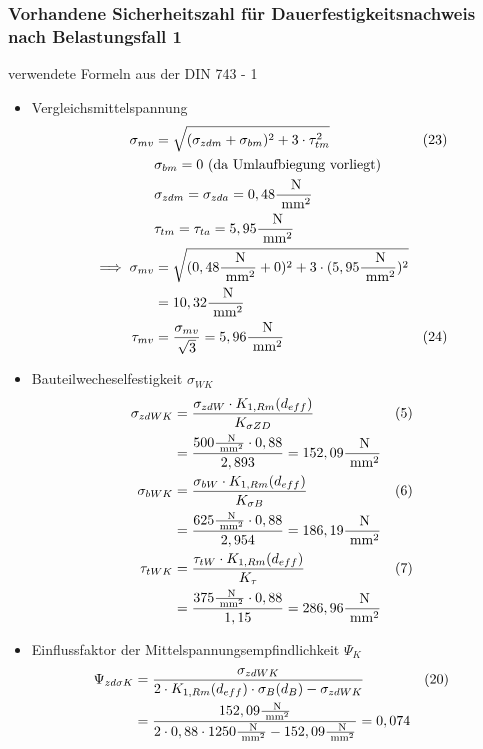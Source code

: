 \subsubsection{Vorhandene Sicherheitszahl für Dauerfestigkeitsnachweis nach Belastungsfall 1 }
verwendete Formeln aus der DIN 743 - 1
\begin{itemize}
\item Vergleichsmittelspannung 
	\begin{align*}
	\sigma_{mv}&= \sqrt{(\sigma_{zdm} +\sigma_{bm} )^2+ 3 \cdot \tau_{tm}^2 } & (23) \\
	&\sigma_{bm}= 0 \text{ (da Umlaufbiegung vorliegt)} \\
	&\sigma_{zdm} = \sigma_{zda} = 0,48\frac{\text{ N}}{\text{ mm}^2} \\
	&\tau_{tm} = \tau_{ta} = 5,95 \frac{\text{ N}}{\text{ mm}^2} \\
	\implies \sigma_{mv}&= \sqrt{(0,48 \frac{\text{ N}}{\text{ mm}^2} +0 )^2+ 3 \cdot (5,95 \frac{\text{ N}}{\text{ mm}^2})^2 }  \\
	&= 10,32 \frac{\text{ N}}{\text{ mm}^2} \\
	\tau_{mv} &= \frac{\sigma_{mv}}{\sqrt{3}} = 5,96 \frac{\text{ N}}{\text{ mm}^2} & (24)
	\end{align*}
\item Bauteilwecheselfestigkeit $\sigma_{WK}$ 
	\begin{align*}
	\sigma_{zdWK}&= \frac{\sigma_{zdW} \cdot K_{1,Rm} (d_{eff})}{K_{\sigma ZD}}  & (5)\\
	&=  \frac{500 \frac{\text{ N}}{\text{ mm}^2}\cdot 0,88}{2,893} = 152,09 \frac{\text{ N}}{\text{ mm}^2}\\
	\sigma_{bWK}&= \frac{\sigma_{bW} \cdot K_{1,Rm} (d_{eff})}{K_{\sigma B}}  & (6 )\\
	&=  \frac{625 \frac{\text{ N}}{\text{ mm}^2}\cdot 0,88}{2,954} = 186,19 \frac{\text{ N}}{\text{ mm}^2}\\
	\tau_{tWK}&= \frac{\tau_{tW} \cdot K_{1,Rm} (d_{eff})}{K_{\tau}} &(7) \\
	&=  \frac{375 \frac{\text{ N}}{\text{ mm}^2}\cdot 0,88}{1,15} = 286,96 \frac{\text{ N}}{\text{ mm}^2}
	\end{align*}
\item Einflussfaktor der Mittelspannungsempfindlichkeit $\Psi_{K}$ 
	\begin{align*}
	\Psi_{zd \sigma K}&= \frac{\sigma_{zdWK}}{2 \x  K_{1,Rm} (d_{eff}) \x \sigma_B (d_B) -\sigma_{zdWK}}  &(20)\\
	&=  \frac{152,09 \frac{\text{ N}}{\text{ mm}^2}}{2 \x 0,88 \x 1250\frac{\text{ N}}{\text{ mm}^2} - 152,09 \frac{\text{ N}}{\text{ mm}^2}} = 0,074 \\

\end{align*}
\end{itemize}
